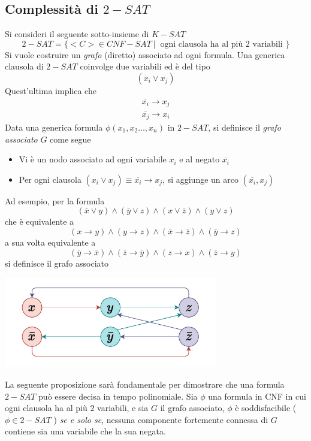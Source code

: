 \documentclass[10pt, letterpaper]{report}
\begin{document}
\subsection{Complessità di $2-SAT$}
Si consideri il seguente sotto-insieme di $K-SAT$
$$ 2-SAT = \{<C>\in CNF-SAT \ | \ \text{ ogni clausola ha al più 2 variabili } \}$$
Si vuole costruire un \textit{grafo} (diretto) associato ad ogni formula. Una generica clausola di $2-SAT$ coinvolge due variabili ed è del tipo 
$$ (x_i \lor x_j)$$
Quest'ultima implica che 
$$ \begin{matrix}
    \overline{x_i}\rightarrow x_j\\ \overline{x_j}\rightarrow x_i
\end{matrix}$$ 
 Data una generica formula $\phi(x_1,x_2\dots , x_n)$ in $2-SAT$, si definisce il \textit{grafo associato}  $G$ come segue \begin{itemize}
    \item Vi è un nodo associato ad ogni variabile $x_i$ e al negato $\overline{x_i}$ 
    \item Per ogni clausola $(x_i \lor x_j)\equiv \overline{x_i}\rightarrow x_j$, si aggiunge un arco $(\overline{x_i},x_j)$
\end{itemize}
Ad esempio, per la formula $$(\bar x \lor y)\land (\bar y\lor z) \land (x \lor \bar z)\land (y\lor z) $$
che è equivalente a 
$$(x\rightarrow y)\land (y\rightarrow z) \land (\bar x \rightarrow \bar z )\land (\bar y \rightarrow z) $$
a sua volta equivalente a 
$$(\bar y \rightarrow \bar x)\land (\bar z\rightarrow \bar y) \land (z \rightarrow x )\land (\bar z \rightarrow y) $$
si definisce il grafo associato 
\begin{center}
    \includegraphics[width=0.7\textwidth ]{images/grafoAssociato.pdf}
\end{center}
La seguente proposizione sarà fondamentale per dimostrare che una formula $2-SAT$ può essere decisa in tempo polinomiale.\acc  
\prop{} Sia $\phi$ una formula in CNF in cui ogni clausola ha al più $2$ variabili, e sia $G$ il grafo associato, $\phi$ è soddisfacibile ($\phi\in 2-SAT$ ) \textit{se e solo se}, 
nessuna componente fortemente connessa di $G$ contiene sia una variabile che la sua negata.\acc 
\end{document}
